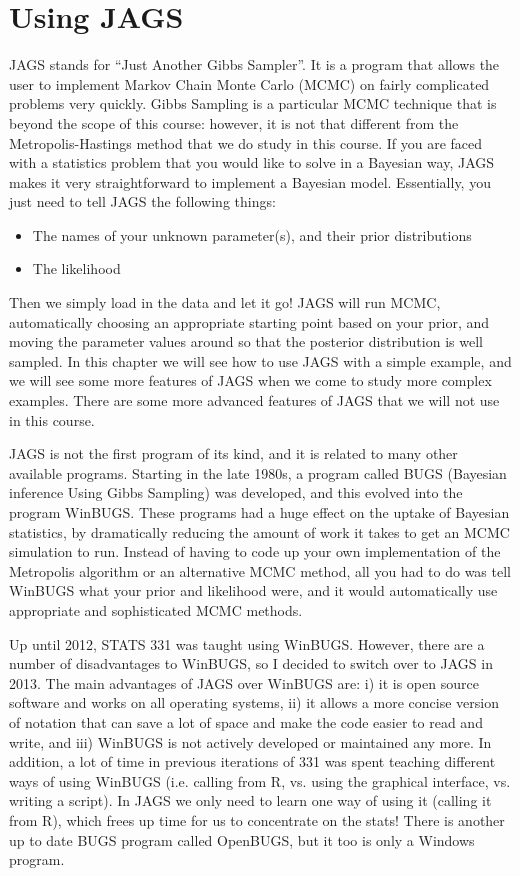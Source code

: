 \chapter{Using JAGS}
JAGS stands for ``Just Another Gibbs Sampler''. It is a program that allows the user
to implement Markov Chain Monte Carlo (MCMC) on fairly complicated problems
very quickly. Gibbs Sampling is a particular MCMC technique that is beyond the
scope of this course: however, it is not that different from the Metropolis-Hastings
method that we do study in this course. If you are faced with a statistics
problem that you would like to solve in a Bayesian way, JAGS makes it very
straightforward to implement a Bayesian model. Essentially, you just need to tell
JAGS the following things:
\begin{itemize}
\item The names of your unknown parameter(s), and their prior distributions
\item The likelihood
\end{itemize}
Then we simply load in the data and let it go! JAGS will run MCMC, automatically
choosing an appropriate starting point based on your prior,
and moving the parameter
values around so that the posterior distribution is well sampled.
In this chapter we will see how to use JAGS with a simple example, and we will
see some more features of JAGS when we come to study more complex examples.
There are some more advanced features of JAGS that we will not use in this
course.

JAGS is not the first program of its kind, and it is related to many other
available programs.
Starting in the late 1980s, a program called BUGS (Bayesian inference Using
Gibbs Sampling) was developed, and this evolved into the program WinBUGS. These
programs had a huge effect on the uptake of Bayesian statistics, by dramatically
reducing the amount of work it takes to get an MCMC simulation to run. Instead
of having to code up your own implementation of the Metropolis algorithm or
an alternative MCMC method, all you had to do was tell WinBUGS what your prior
and likelihood were, and it would automatically use appropriate and sophisticated
MCMC methods.

Up until 2012, STATS 331 was taught using WinBUGS.
However, there are a number of disadvantages to
WinBUGS, so I decided to switch over to JAGS in 2013. The main advantages of
JAGS over WinBUGS are: i) it is open source software and works on all
operating systems, ii) it allows a more concise version of notation that can
save a lot of space and make the code easier to read and write, and iii) 
WinBUGS is not actively developed or maintained any more. In addition, a lot of time in previous iterations of 331 was spent teaching
different ways of using WinBUGS (i.e. calling from R, vs. using the graphical
interface, vs. writing a script). In JAGS we only need to learn one way of using
it (calling it from R), which frees up time for us to concentrate on the stats!
There is another up to date BUGS program called OpenBUGS, but it too is only
a Windows program.

